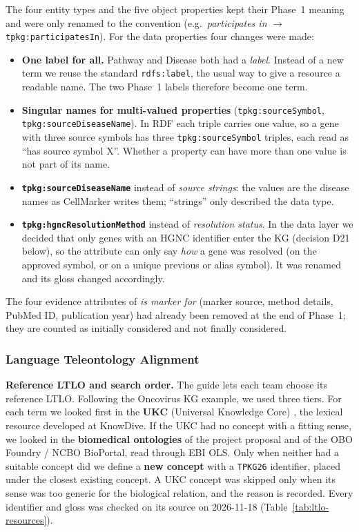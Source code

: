 \noindent The four entity types and the five object properties kept their Phase~1 meaning and were only renamed to the convention (e.g.\ \emph{participates in} $\rightarrow$ \texttt{tpkg:participatesIn}). For the data properties four changes were made:
\begin{itemize}
    \item \textbf{One label for all.} Pathway and Disease both had a \emph{label}. Instead of a new term we reuse the standard \texttt{rdfs:label}, the usual way to give a resource a readable name. The two Phase~1 labels therefore become one term.
    \item \textbf{Singular names for multi-valued properties} (\texttt{tpkg:sourceSymbol}, \texttt{tpkg:sourceDiseaseName}). In RDF each triple carries one value, so a gene with three source symbols has three \texttt{tpkg:sourceSymbol} triples, each read as ``has source symbol X''. Whether a property can have more than one value is not part of its name.
    \item \textbf{\texttt{tpkg:sourceDiseaseName}} instead of \emph{source strings}: the values are the disease names as CellMarker writes them; ``strings'' only described the data type.
    \item \textbf{\texttt{tpkg:hgncResolutionMethod}} instead of \emph{resolution status}. In the data layer we decided that only genes with an HGNC identifier enter the KG (decision D21 below), so the attribute can only say \emph{how} a gene was resolved (on the approved symbol, or on a unique previous or alias symbol). It was renamed and its gloss changed accordingly.
\end{itemize}
The four evidence attributes of \emph{is marker for} (marker source, method details, PubMed ID, publication year) had already been removed at the end of Phase~1; they are counted as initially considered and not finally considered.

\subsubsection{Language Teleontology Alignment}

\noindent\textbf{Reference LTLO and search order.} The guide lets each team choose its reference LTLO. Following the Oncovirus KG example, we used three tiers. For each term we looked first in the \textbf{UKC} (Universal Knowledge Core) \cite{giunchiglia2017understanding}, the lexical resource developed at KnowDive. If the UKC had no concept with a fitting sense, we looked in the \textbf{biomedical ontologies} of the project proposal and of the OBO Foundry / NCBO BioPortal, read through EBI OLS. Only when neither had a suitable concept did we define a \textbf{new concept} with a \texttt{TPKG26} identifier, placed under the closest existing concept. A UKC concept was skipped only when its sense was too generic for the biological relation, and the reason is recorded. Every identifier and gloss was checked on its source on 2026-11-18 (Table~\ref{tab:ltlo-resources}).


